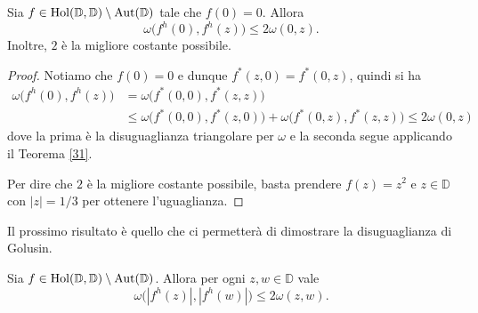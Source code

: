 \begin{cor} \label{36}
  Sia $f \in \text{\normalfont{Hol}}(\mathbb{D},\mathbb{D})\setminus\text{\normalfont{Aut}}(\mathbb{D})$ tale che $f(0)=0$. Allora
  \begin{equation}
    \omega\bigl(f^h(0),f^h(z)\bigr) \le 2\omega(0,z).
  \end{equation}
  Inoltre, $2$ è la migliore costante possibile.
\end{cor}

\begin{proof}
  Notiamo che $f(0)=0$ e dunque $f^*(z,0)=f^*(0,z)$, quindi si ha
  \begin{align*}
    \omega\bigl(f^h(0),f^h(z)\bigr) & = \omega\bigl(f^*(0,0),f^*(z,z)\bigr) \\
    & \le \omega\bigl(f^*(0,0),f^*(z,0)\bigr)+\omega\bigl(f^*(0,z),f^*(z,z)\bigr)\le 2\omega(0,z)
  \end{align*}
  dove la prima è la disuguaglianza triangolare per $\omega$ e la seconda segue applicando il Teorema \ref{31}.

  Per dire che $2$ è la migliore costante possibile, basta prendere $f(z)=z^2$ e $z \in \mathbb{D}$ con $|z|=1/3$ per ottenere l'uguaglianza.
\end{proof}

Il prossimo risultato è quello che ci permetterà di dimostrare la disuguaglianza di Golusin.

\begin{cor} \label{quasigolusin}
  Sia $f \in \text{\normalfont{Hol}}(\mathbb{D},\mathbb{D})\setminus\text{\normalfont{Aut}}(\mathbb{D})$. Allora per ogni $z, w \in \mathbb{D}$ vale
  \begin{equation} \label{quasigol}
    \omega\bigl(|f^h(z)|, |f^h(w)|\bigr) \le 2\omega(z,w).
  \end{equation}
\end{cor}

